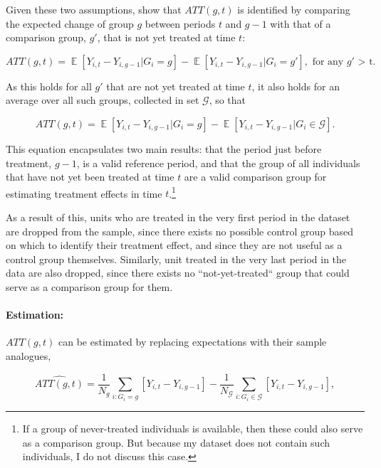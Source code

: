 Given these two assumptions, \citet{callaway2021difference} show that
$ATT(g,t)$ is identified by comparing the expected change of group $g$ between
periods $t$ and $g-1$ with that of a comparison group, $g'$, that is not yet
treated at time $t$:

\begin{equation}
    ATT(g,t) = \mathop{\mathbb{E}}[Y_{i,t} - Y_{i,g-1}|G_i = g] -
    \mathop{\mathbb{E}}[Y_{i,t} - Y_{i,g-1}|G_i = g'], \text{ for any $g'$ >
    t}.
\end{equation}

As this holds for all $g'$ that are not yet treated at time $t$, it also holds
for an average over all such groups, collected in set $\mathcal{G}$, so that

\begin{equation}
    ATT(g,t) = \mathop{\mathbb{E}}[Y_{i,t} - Y_{i,g-1}|G_i = g] -
    \mathop{\mathbb{E}}[Y_{i,t} - Y_{i,g-1}|G_i \in \mathcal{G}].
\end{equation}

This equation encapsulates two main results: that the period just before
treatment, $g-1$, is a valid reference period, and that the group of all
individuals that have not yet been treated at time $t$ are a valid comparison
group for estimating treatment effects in time $t$.\footnote{If a group of
never-treated individuals is available, then these could also serve as a
comparison group. But because my dataset does not contain such individuals, I
do not discuss this case.}

As a result of this, units who are treated in the very first period in the
dataset are dropped from the sample, since there exists no possible control
group based on which to identify their treatment effect, and since they are not
useful as a control group themselves. Similarly, unit treated in the very last
period in the data are also dropped, since there exists no ``not-yet-treated``
group that could serve as a comparison group for them.


\paragraph{Estimation:}%
\label{par:estimation_}

$ATT(g,t)$ can be estimated by replacing expectations with their sample
analogues,

\begin{equation}
    \widehat{ATT(g,t)} = \frac{1}{N_g}\sum_{i:G_i=g}[Y_{i,t} - Y_{i, g-1}] -
    \frac{1}{N_\mathcal{G}}\sum_{i:G_i \in \mathcal{G}}[Y_{i,t} - Y_{i, g-1}],
\end{equation}

